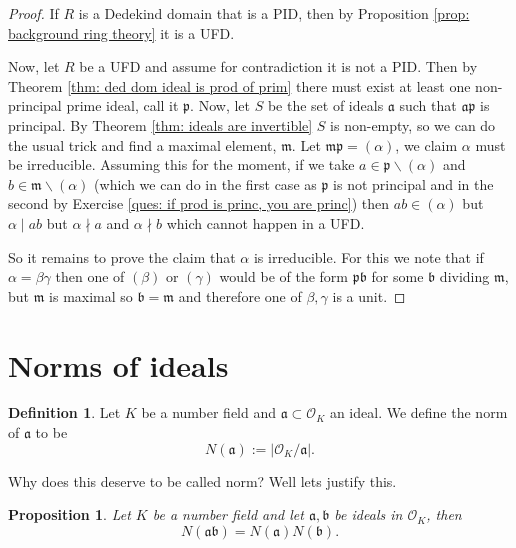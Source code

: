\documentclass[11pt,a4paper]{report}
\theoremstyle{plain}
\newtheorem{prop}[subsection]{Proposition}
\theoremstyle{definition}
\newtheorem{defn}[subsection]{Definition}
\theoremstyle{definition}
\def\gothb{\mathfrak{b}}
\def\gothm{\mathfrak{m}}
\def\gothp{\mathfrak{p}}
\def \a{\alpha}
\def \OO {\mathcal{O}}
\def\gotha{\mathfrak{a}}
\begin{document}
\begin{proof}
If $R$ is a Dedekind domain that is a PID, then by Proposition \ref{prop: background ring theory} it is a UFD. 

Now, let $R$ be a UFD and assume for contradiction it is not a PID. Then by Theorem \ref{thm: ded dom ideal is prod of prim} there must exist at least one non-principal prime ideal, call it $\gothp$. Now, let $S$ be the set of ideals $\gotha$ such that $\gotha \gothp$ is principal. By Theorem \ref{thm: ideals are invertible} $S$ is non-empty, so we can do the usual trick and find a maximal element, $\gothm$. Let $\gothm\gothp=(\a)$, we claim $\a$ must be irreducible. Assuming this for the moment, if we take $a \in \gothp \backslash (\a)$ and $b \in \gothm \backslash (\a)$ (which we can do in the first case as $\gothp$ is not principal and in the second by Exercise \ref{ques: if prod is princ, you are princ}) then $ab \in (\a)$ but $\a \mid ab$ but $\a \nmid a$ and $\a \nmid b$ which cannot happen in a UFD.

So it remains to prove the claim that $\a$ is irreducible. For this we note that if $\a=\beta\gamma$ then one of $(\beta)$ or $(\gamma)$ would be of the form $\gothp\gothb$ for some $\gothb$ dividing $\gothm$, but $\gothm$ is maximal so $\gothb=\gothm$ and therefore one of $\beta,\gamma$ is a unit.
\end{proof}


\section{Norms of ideals}


\begin{defn}
Let $K$ be a number field and $\gotha \subset \OO_K$ an ideal. We define the norm of $\gotha$ to be \[N(\gotha):=|\OO_K / \gotha|.\]
\end{defn}

Why does this deserve to be called norm? Well lets justify this.

\begin{prop}\label{prop: norm of ideal is mult}
Let $K$ be a number field and let $\gotha,\gothb$ be ideals in $\OO_K$, then \[N(\gotha \gothb)=N(\gotha)N(\gothb).\]
\end{prop}
\end{document}
